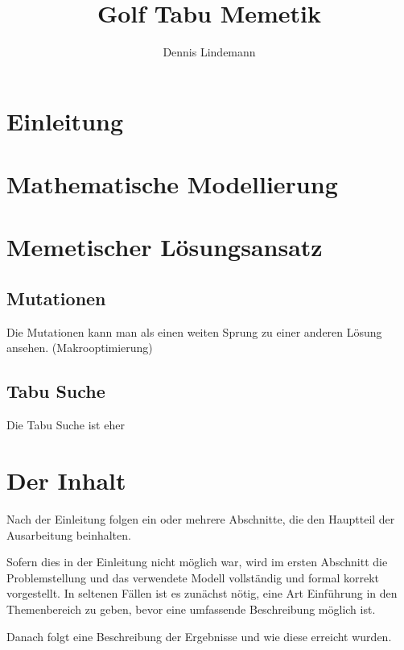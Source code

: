 \documentclass[draft]{tcs-seminar}
\begin{document}
\title{Golf Tabu Memetik}
\author{Dennis Lindemann}

\begin{abstract}

\end{abstract}

\maketitle


\section{Einleitung}
  


\section{Mathematische Modellierung}
    
\section{Memetischer Lösungsansatz}
  \subsection{Mutationen}
    Die Mutationen kann man als einen weiten Sprung zu einer anderen Lösung ansehen. (Makrooptimierung)
  \subsection{Tabu Suche}
    Die Tabu Suche ist eher






\section{Der Inhalt}

Nach der Einleitung folgen ein oder mehrere Abschnitte,
die den Hauptteil der Ausarbeitung beinhalten.

Sofern dies in der Einleitung nicht möglich war,
wird im ersten Abschnitt die Problemstellung und das verwendete Modell
vollständig und formal korrekt vorgestellt.
In seltenen Fällen ist es zunächst nötig,
eine Art Einführung in den Themenbereich zu geben,
bevor eine umfassende Beschreibung möglich ist.

Danach folgt eine Beschreibung der Ergebnisse und wie diese erreicht wurden.
\end{document}

